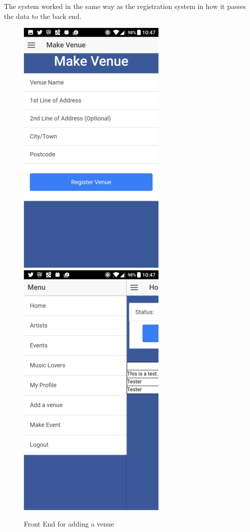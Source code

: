 The system worked in the same way as the registration system in how it passes the data to the back end.
\begin{center}
\begin{figure}[H]
\includegraphics[scale=0.5]{images/sc12}
\includegraphics[scale=0.5]{images/sc13}
\caption{Front End for adding a venue}
\end{figure}
\end{center}

